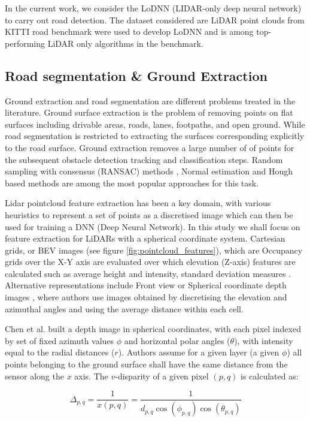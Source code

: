 \documentclass[10pt,twocolumn,letterpaper]{article}
\begin{document}
In the current work, we consider the LoDNN (LIDAR-only deep neural network) \cite{lodnn2017} to carry out road detection. The dataset considered are LiDAR point clouds from KITTI road benchmark were used to develop LoDNN and is among top-performing LiDAR only algorithms in the benchmark\cite{Fritsch2013ITSC}.

\subsection{Road segmentation \& Ground Extraction}
Ground extraction and road segmentation are different problems treated in the literature. Ground surface extraction is the problem of removing points on flat surfaces including drivable areas, roads, lanes, footpaths, and open ground. While road segmentation is restricted to extracting the surfaces corresponding explicitly to the road surface. Ground extraction removes a large number of of points for the subsequent obstacle detection tracking and classification steps. Random sampling with consensus (RANSAC) methods , Normal estimation and Hough based methods are among the most popular approaches for this task.

Lidar pointcloud feature extraction has been a key domain, with various heuristics to represent a set of points as a discretised image which can then be used for training a DNN (Deep Neural Network). In this study we shall focus on feature extraction for LiDARs with a spherical coordinate system. Cartesian grids, or BEV images (see figure \ref{fig:pointcloud_features}), which are Occupancy grids over the X-Y axis are evaluated over which elevation (Z-axis) features are calculated such as average height and intensity, standard deviation measures \cite{lodnn2017}. Alternative representations include Front view or Spherical coordinate depth images \cite{wu2018squeezeseg}, \cite{lyu2018chipnet} where authors use images obtained by discretising the elevation and azimuthal angles and using the average distance within each cell.

Chen et al. \cite{chen2017lidar} built a depth image in spherical coordinates, with each pixel indexed by set of fixed azimuth values $\phi$ and horizontal polar angles ($\theta$), with intensity equal to the radial distances ($r$). Authors assume for a given layer (a given $\phi$) all points belonging to the ground surface shall have the same distance from the sensor along the $x$ axis. The $v$-disparity of a given pixel $(p,q)$ is calculated as:

\begin{equation}
\label{eq:LidarHistogram}
\Delta_{p,q} = \frac{1}{x(p,q)}=\frac{1}{d_{p,q}\cos(\phi_{p,q})\cos(\theta_{p,q})}
\end{equation}
\end{document}
